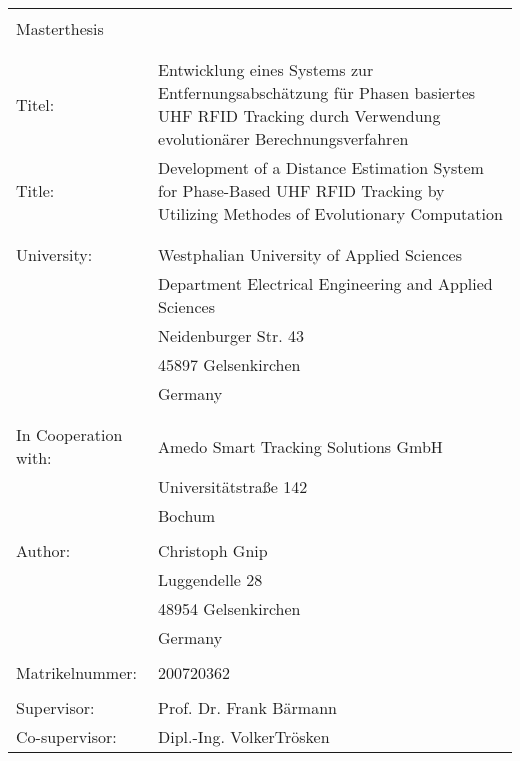 \begin{longtable}{p{4cm}p{11cm}}
{} & {}\\
\Large{Masterthesis} & {}\\
{} & {}\\
{} & {}\\
Titel: & Entwicklung eines Systems zur
Entfernungsabschätzung für Phasen basiertes UHF RFID Tracking durch Verwendung
evolutionärer Berechnungsverfahren\\
Title: & Development of a Distance Estimation System for
Phase-Based UHF RFID Tracking by Utilizing Methodes of Evolutionary Computation\\
{} & {}\\
{} & {}\\
University:                 & Westphalian University of Applied Sciences \\
{} & Department Electrical Engineering and Applied Sciences \\
{}                          & Neidenburger Str. 43 \\
{}                          & 45897 Gelsenkirchen \\
{}                          & Germany \\
{}                          & {}\\
{}                          & {}\\
In Cooperation with:        & Amedo Smart Tracking Solutions GmbH\\
{}                          & Universitätstraße 142 \\
{}                          & Bochum \\
{}                          & {}\\
Author:                     & Christoph Gnip \\
{}                          & Luggendelle 28 \\
{}                          & 48954 Gelsenkirchen \\
{}                          & Germany \\
{}                          & {}\\
Matrikelnummer:			& 200720362 \\
{}                          & {}\\
Supervisor:                 & Prof. Dr. Frank Bärmann \\
Co-supervisor:              & Dipl.-Ing. VolkerTrösken\\
\end{longtable}

\newpage